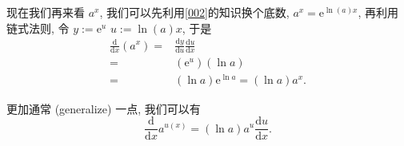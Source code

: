 \begin{tcolorbox}[size=fbox, breakable, enhanced jigsaw, title={指数函数}]
现在我们再来看 $a^x$, 我们可以先利用\ref{002}的知识换个底数,
$a^x=\mathrm{e}^{\ln(a)x}$, 再利用链式法则, 令 $y:=\mathrm{e}^u$
$u:=\ln{(a)}x$, 于是
\begin{align*}
\frac{\mathrm{d}}{\mathrm{d}x}(a^x)=&\frac{\mathrm{d}y}{\mathrm{d}u}\frac{\mathrm{d}u}{\mathrm{d}x}\\
=&(\mathrm{e}^u)(\ln{a})\\
=&(\ln{a})\mathrm{e}^{\ln{a}}=(\ln{a})a^x.
\end{align*}

更加通常 (generalize) 一点, 我们可以有
\begin{equation*}
\boxed{\frac{\mathrm{d}}{\mathrm{d}x}a^{u(x)}=(\ln{a})a^u\frac{\mathrm{d}u}{\mathrm{d}x}}.
\end{equation*}

\end{tcolorbox}

